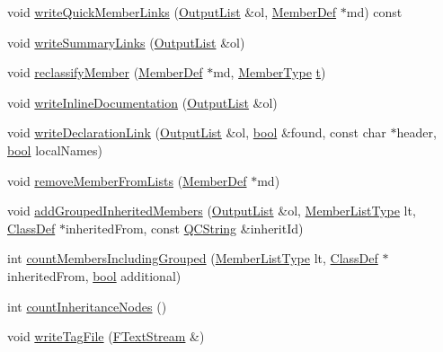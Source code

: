 \begin{DoxyCompactItemize}
\item 
void \hyperlink{class_class_def_a97686ab4227dc6f1d334e6dd9fceeff1}{write\+Quick\+Member\+Links} (\hyperlink{class_output_list}{Output\+List} \&ol, \hyperlink{class_member_def}{Member\+Def} $\ast$md) const 
\item 
void \hyperlink{class_class_def_a762b3d42ab68e224a073fce8dce2c905}{write\+Summary\+Links} (\hyperlink{class_output_list}{Output\+List} \&ol)
\item 
void \hyperlink{class_class_def_a5bec49ae8b7277ebfa0fab4c383bc35f}{reclassify\+Member} (\hyperlink{class_member_def}{Member\+Def} $\ast$md, \hyperlink{types_8h_a63e3de542c5d38de617ab78c8c8f5a41}{Member\+Type} \hyperlink{058__bracket__recursion_8tcl_a69e959f6901827e4d8271aeaa5fba0fc}{t})
\item 
void \hyperlink{class_class_def_a5c0ec6a3c4ebf12f8c703dbdfdc36e97}{write\+Inline\+Documentation} (\hyperlink{class_output_list}{Output\+List} \&ol)
\item 
void \hyperlink{class_class_def_acfe84f175c0d9652a6f574281cfbd0e1}{write\+Declaration\+Link} (\hyperlink{class_output_list}{Output\+List} \&ol, \hyperlink{qglobal_8h_a1062901a7428fdd9c7f180f5e01ea056}{bool} \&found, const char $\ast$header, \hyperlink{qglobal_8h_a1062901a7428fdd9c7f180f5e01ea056}{bool} local\+Names)
\item 
void \hyperlink{class_class_def_ad957ae01f33b8754e9282fe626269a99}{remove\+Member\+From\+Lists} (\hyperlink{class_member_def}{Member\+Def} $\ast$md)
\item 
void \hyperlink{class_class_def_aa6725cc867bb09e18951b95c75b2a7d7}{add\+Grouped\+Inherited\+Members} (\hyperlink{class_output_list}{Output\+List} \&ol, \hyperlink{types_8h_abe8ad5992f8938a28f918f51b199aa19}{Member\+List\+Type} lt, \hyperlink{class_class_def}{Class\+Def} $\ast$inherited\+From, const \hyperlink{class_q_c_string}{Q\+C\+String} \&inherit\+Id)
\item 
int \hyperlink{class_class_def_a03ba89063fd96b9447c3a82c2c442df7}{count\+Members\+Including\+Grouped} (\hyperlink{types_8h_abe8ad5992f8938a28f918f51b199aa19}{Member\+List\+Type} lt, \hyperlink{class_class_def}{Class\+Def} $\ast$inherited\+From, \hyperlink{qglobal_8h_a1062901a7428fdd9c7f180f5e01ea056}{bool} additional)
\item 
int \hyperlink{class_class_def_a3b37eb6ab9dc15011f92a450fea26515}{count\+Inheritance\+Nodes} ()
\item 
void \hyperlink{class_class_def_a6e34f3f113b0b1334c2458c05d9b9878}{write\+Tag\+File} (\hyperlink{class_f_text_stream}{F\+Text\+Stream} \&)
\end{DoxyCompactItemize}
